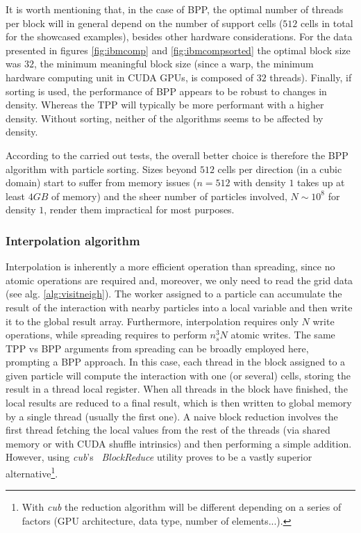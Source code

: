 \documentclass[ twoside,openright,titlepage,numbers=noenddot,%
headinclude,footinclude,cleardoublepage=empty,abstract=on,
BCOR=5mm,paper=b5,fontsize=11pt, dvipsnames
]{scrreprt}
\begin{document}
It is worth mentioning that, in the case of BPP, the optimal number of threads per block will in general depend on the number of support cells ($512$ cells in total for the showcased examples), besides other hardware considerations. For the data presented in figures \ref{fig:ibmcomp} and \ref{fig:ibmcompsorted} the optimal block size was $32$, the minimum meaningful block size (since a warp, the minimum hardware computing unit in CUDA GPUs, is composed of $32$ threads).
Finally, if sorting is used, the performance of BPP appears to be robust to changes in density. Whereas the TPP will typically be more performant with a higher density. Without sorting, neither of the algorithms seems to be affected by density.

According to the carried out tests, the overall better choice is therefore the BPP algorithm with particle sorting.
Sizes beyond $512$ cells per direction (in a cubic domain) start to suffer from memory issues ($n=512$ with density $1$ takes up at least $4GB$ of memory) and the sheer number of particles involved, $N\sim 10^8$ for density $1$, render them impractical for most purposes.


\subsubsection*{Interpolation algorithm}
Interpolation is inherently a more efficient operation than spreading, since no atomic operations are required and, moreover, we only need to read the grid data (see alg. \ref{alg:visitneigh}). The worker assigned to a particle can accumulate the result of the interaction with nearby particles into a local variable and then write it to the global result array. Furthermore, interpolation requires only $N$ write operations, while spreading requires to perform $n_s^3N$ atomic writes.
The same TPP vs BPP arguments from spreading can be broadly employed here, prompting a BPP approach. In this case, each thread in the block assigned to a given particle will compute the interaction with one (or several) cells, storing the result in a thread local register.
When all threads in the block have finished, the local results are reduced to a final result, which is then written to global memory by a single thread (usually the first one).
A naive block reduction involves the first thread fetching the local values from the rest of the threads (via shared memory or with CUDA shuffle intrinsics) and then performing a simple addition. However, using \emph{cub}'s~\cite{cub} \emph{BlockReduce} utility proves to be a vastly superior alternative\footnote{With \emph{cub} the reduction algorithm will be different depending on a series of factors (GPU architecture, data type, number of elements...).}.
\end{document}
